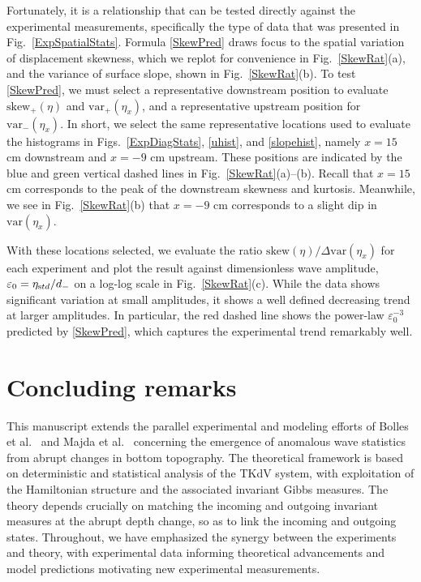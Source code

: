 \documentclass[11pt]{article}
\newcommand{\eps}{\varepsilon}
\newcommand{\etastd}{\eta_{\text std}}
\newcommand{\depth}{d}
\newcommand{\dup}{\depth_{-}}
\newcommand{\skw}{\text{skew}}
\newcommand{\skwdn}{\skw_+}
\newcommand{\var}{\text{var}}
\newcommand{\varup}{\var_-}
\newcommand{\vardn}{\var_+}
\newcommand{\epsup}{\eps_0}
\begin{document}
	Fortunately, it is a relationship that can be tested directly against the experimental measurements, specifically the type of data that was presented in Fig.~\ref{ExpSpatialStats}. Formula \eqref{SkewPred} draws focus to the spatial variation of displacement skewness, which we replot for convenience in Fig.~\ref{SkewRat}(a), and the variance of surface slope, shown in Fig.~\ref{SkewRat}(b). To test \eqref{SkewPred}, we must select a representative downstream position to evaluate $\skwdn(\eta)$ and $\vardn(\eta_x)$, and a representative upstream position for $\varup(\eta_x)$. In short, we select the same representative locations  used to evaluate the histograms in Figs.~\ref{ExpDiagStats}, \ref{uhist}, and \ref{slopehist}, namely $x = 15$ cm downstream and $x = -9$ cm upstream. These positions are indicated by the blue and green vertical dashed lines in Fig.~\ref{SkewRat}(a)--(b). Recall that $x = 15$ cm corresponds to the peak of the downstream skewness and kurtosis. Meanwhile, we see in Fig.~\ref{SkewRat}(b) that $x = -9$ cm corresponds to a slight dip in $\var(\eta_x)$.

	With these locations selected, we evaluate the ratio $\skw(\eta) / \Delta \var(\eta_x)$ for each experiment and plot the result against dimensionless wave amplitude, $\epsup = \etastd / \dup$ on a log-log scale in Fig.~\ref{SkewRat}(c). While the data shows significant variation at small amplitudes, it shows a well defined decreasing trend at larger amplitudes. In particular, the red dashed line shows the power-law $\epsup^{-3}$ predicted by \eqref{SkewPred}, which captures the experimental trend remarkably well.




\section{Concluding remarks}

	This manuscript extends the parallel experimental and modeling efforts of Bolles et al.~\cite{bolles2019} and Majda et al.~\cite{majda2019} concerning the emergence of anomalous wave statistics from abrupt changes in bottom topography. The theoretical framework is based on deterministic and statistical analysis of the TKdV system, with exploitation of the Hamiltonian structure and the associated invariant Gibbs measures. The theory depends crucially on matching the incoming and outgoing invariant measures at the abrupt depth change, so as to link the incoming and outgoing states. Throughout, we have emphasized the synergy between the experiments and theory, with experimental data informing theoretical advancements and model predictions motivating new experimental measurements.
	
\end{document}
